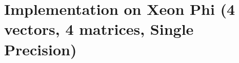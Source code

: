 \documentclass{beamer}
\begin{document}
\section{Implementation on Xeon Phi (4 vectors, 4 matrices, Single Precision)}

    

\end{document}

